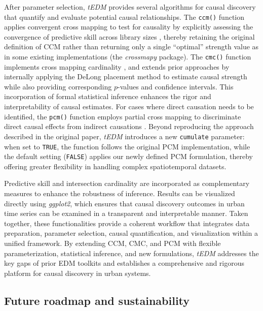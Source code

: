 \documentclass[authoryear,preprint,review,12pt]{elsarticle}
\begin{document}
After parameter selection, \textit{tEDM} provides several algorithms for causal discovery that quantify and evaluate potential causal relationships. The \texttt{ccm()} function applies convergent cross mapping to test for causality by explicitly assessing the convergence of predictive skill across library sizes \citep{sugihara2012ccm}, thereby retaining the original definition of CCM rather than returning only a single “optimal” strength value as in some existing implementations (the \textit{crossmapy} package). The \texttt{cmc()} function implements cross mapping cardinality \citep{tao2023cmc}, and extends prior approaches by internally applying the DeLong placement method to estimate causal strength while also providing corresponding $p$-values and confidence intervals. This incorporation of formal statistical inference enhances the rigor and interpretability of causal estimates. For cases where direct causation needs to be identified, the \texttt{pcm()} function employs partial cross mapping to discriminate direct causal effects from indirect causations \citep{leng2020pcm}. Beyond reproducing the approach described in the original paper, \textit{tEDM} introduces a new \texttt{cumulate} parameter: when set to \texttt{TRUE}, the function follows the original PCM implementation, while the default setting (\texttt{FALSE}) applies our newly defined PCM formulation, thereby offering greater flexibility in handling complex spatiotemporal datasets.  

Predictive skill and intersection cardinality are incorporated as complementary measures to enhance the robustness of inference. Results can be visualized directly using \textit{ggplot2}, which ensures that causal discovery outcomes in urban time series can be examined in a transparent and interpretable manner. Taken together, these functionalities provide a coherent workflow that integrates data preparation, parameter selection, causal quantification, and visualization within a unified framework. By extending CCM, CMC, and PCM with flexible parameterization, statistical inference, and new formulations, \textit{tEDM} addresses the key gaps of prior EDM toolkits and establishes a comprehensive and rigorous platform for causal discovery in urban systems.  

\subsection{Future roadmap and sustainability}
\end{document}
